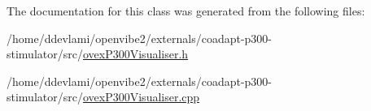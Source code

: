 The documentation for this class was generated from the following files:\begin{DoxyCompactItemize}
\item 
/home/ddevlami/openvibe2/externals/coadapt-\/p300-\/stimulator/src/\hyperlink{ovexP300Visualiser_8h}{ovexP300Visualiser.h}\item 
/home/ddevlami/openvibe2/externals/coadapt-\/p300-\/stimulator/src/\hyperlink{ovexP300Visualiser_8cpp}{ovexP300Visualiser.cpp}\end{DoxyCompactItemize}
